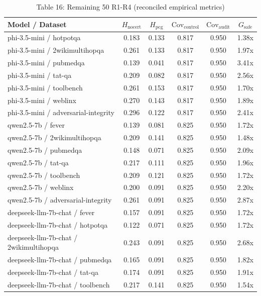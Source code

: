 \begin{table}[h]
\centering
\small
\caption{Table 16: Remaining 50 R1-R4 (reconciled empirical metrics)}
\label{tab:appendix_remaining_50_r1r4_old}
\begin{tabular}{l|cc|cc|c}
\hline
Model / Dataset & $H_{\mathrm{nocert}}$ & $H_{\mathrm{pcg}}$ & $\mathrm{Cov}_{\mathrm{control}}$ & $\mathrm{Cov}_{\mathrm{audit}}$ & $G_{\mathrm{safe}}$ \\
\hline
phi-3.5-mini / hotpotqa & 0.183 & 0.133 & 0.817 & 0.950 & 1.38x \\
phi-3.5-mini / 2wikimultihopqa & 0.261 & 0.133 & 0.817 & 0.950 & 1.97x \\
phi-3.5-mini / pubmedqa & 0.139 & 0.041 & 0.817 & 0.950 & 3.41x \\
phi-3.5-mini / tat-qa & 0.209 & 0.082 & 0.817 & 0.950 & 2.56x \\
phi-3.5-mini / toolbench & 0.261 & 0.153 & 0.817 & 0.950 & 1.70x \\
phi-3.5-mini / weblinx & 0.270 & 0.143 & 0.817 & 0.950 & 1.89x \\
phi-3.5-mini / adversarial-integrity & 0.296 & 0.122 & 0.817 & 0.950 & 2.41x \\
qwen2.5-7b / fever & 0.139 & 0.081 & 0.825 & 0.950 & 1.72x \\
qwen2.5-7b / 2wikimultihopqa & 0.209 & 0.141 & 0.825 & 0.950 & 1.48x \\
qwen2.5-7b / pubmedqa & 0.148 & 0.071 & 0.825 & 0.950 & 2.09x \\
qwen2.5-7b / tat-qa & 0.217 & 0.111 & 0.825 & 0.950 & 1.96x \\
qwen2.5-7b / toolbench & 0.209 & 0.121 & 0.825 & 0.950 & 1.72x \\
qwen2.5-7b / weblinx & 0.200 & 0.091 & 0.825 & 0.950 & 2.20x \\
qwen2.5-7b / adversarial-integrity & 0.261 & 0.091 & 0.825 & 0.950 & 2.87x \\
deepseek-llm-7b-chat / fever & 0.157 & 0.091 & 0.825 & 0.950 & 1.72x \\
deepseek-llm-7b-chat / hotpotqa & 0.122 & 0.071 & 0.825 & 0.950 & 1.72x \\
deepseek-llm-7b-chat / 2wikimultihopqa & 0.243 & 0.091 & 0.825 & 0.950 & 2.68x \\
deepseek-llm-7b-chat / pubmedqa & 0.165 & 0.091 & 0.825 & 0.950 & 1.82x \\
deepseek-llm-7b-chat / tat-qa & 0.174 & 0.091 & 0.825 & 0.950 & 1.91x \\
deepseek-llm-7b-chat / toolbench & 0.217 & 0.141 & 0.825 & 0.950 & 1.54x \\

\end{tabular}
\end{table}
